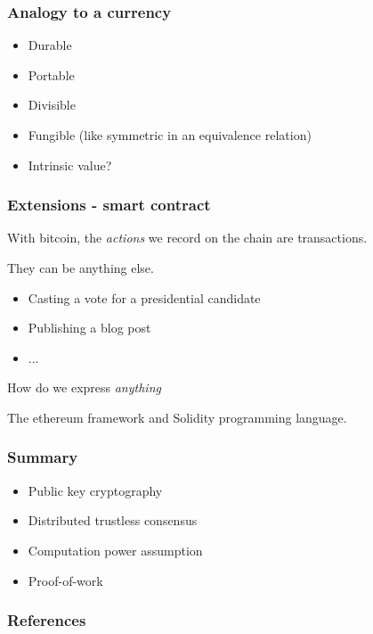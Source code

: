 \documentclass{beamer}
\begin{document}
\begin{frame}
\frametitle{Analogy to a currency}

\begin{itemize}
  \item Durable
  \item Portable
  \item Divisible
  \item Fungible (like symmetric in an equivalence relation)
  \item Intrinsic value?
\end{itemize}

\end{frame}

\begin{frame}
\frametitle{Extensions - smart contract}

With bitcoin, the \textit{actions} we record on the chain are transactions.

They can be anything else.

\vspace{0.2in}

\begin{itemize}
  \item Casting a vote for a presidential candidate
  \item Publishing a blog post
  \item ...
\end{itemize}

\vspace{0.2in}
How do we express \textit{anything}

The ethereum framework and Solidity programming language.

\end{frame}

\begin{frame}
\frametitle{Summary}

\begin{itemize}
  \item Public key cryptography
  \item Distributed trustless consensus
  \item Computation power assumption
  \item Proof-of-work
\end{itemize}

\end{frame}

\begin{frame}
\frametitle{References}

\end{frame}
\end{document}

